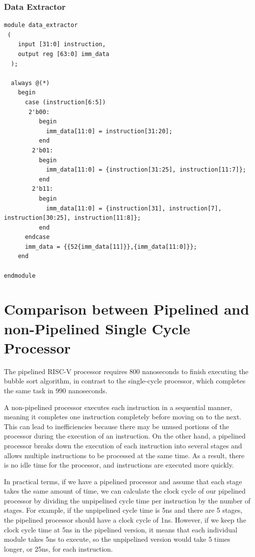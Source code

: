 \documentclass{article}
\begin{document}
\subsubsection{Data Extractor}
\begin{lstlisting}[caption={Design Module for Data Extractor}, captionpos=b, language=RISC-V]
module data_extractor
 (
    input [31:0] instruction,
    output reg [63:0] imm_data
  );
  
  always @(*)
    begin
      case (instruction[6:5])
       2'b00:
          begin
            imm_data[11:0] = instruction[31:20];
          end
        2'b01:
          begin
            imm_data[11:0] = {instruction[31:25], instruction[11:7]};
          end
        2'b11:
          begin
            imm_data[11:0] = {instruction[31], instruction[7], instruction[30:25], instruction[11:8]};
          end
      endcase
      imm_data = {{52{imm_data[11]}},{imm_data[11:0]}};
    end  
  
endmodule
\end{lstlisting}
\section{Comparison between Pipelined and non-Pipelined
Single Cycle Processor}
The pipelined RISC-V processor requires 800 nanoseconds to finish executing the bubble sort algorithm, in contrast to the single-cycle processor, which completes the same task in 990 nanoseconds. 

A non-pipelined processor executes each instruction in a sequential manner, meaning it completes one instruction completely before moving on to the next. This can lead to inefficiencies because there may be unused portions of the processor during the execution of an instruction. On the other hand, a pipelined processor breaks down the execution of each instruction into several stages and allows multiple instructions to be processed at the same time. As a result, there is no idle time for the processor, and instructions are executed more quickly.

In practical terms, if we have a pipelined processor and assume that each stage takes the same amount of time, we can calculate the clock cycle of our pipelined processor by dividing the unpipelined cycle time per instruction by the number of stages. For example, if the unpipelined cycle time is 5ns and there are 5 stages, the pipelined processor should have a clock cycle of 1ns. However, if we keep the clock cycle time at 5ns in the pipelined version, it means that each individual module takes 5ns to execute, so the unpipelined version would take 5 times longer, or 25ns, for each instruction.
\end{document}
